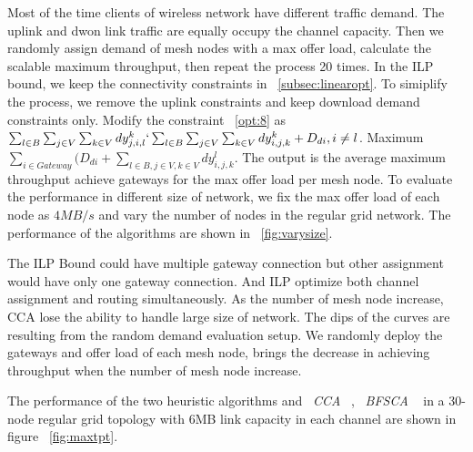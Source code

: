 
Most of the time clients of wireless network have different traffic demand. The uplink and dwon link traffic are equally occupy the channel capacity.
   Then we randomly assign demand of mesh nodes with a max offer load,
   calculate the scalable maximum throughput, then repeat the process 20 times.
   In the ILP bound, we keep the connectivity constraints in ~\ref{subsec:linearopt}. To simiplify the process, we remove the uplink constraints and keep download demand constraints only. 
   Modify the constraint ~\ref{opt:8} as 
   $\sum_{l \in B} \sum_{j \in V} \sum_{k \in V} dy^k_{j,i,l} \lq \sum_{l \in B} \sum_{j \in V} \sum_{k \in V} dy^k_{i,j,k}+D_{di}, i \neq l$. 
   Maximum $\sum_{i\in Gateway} (D_{di}+\sum_{l\in B,j\in V, k \in V}dy^l_{i,j,k}$.
The output is the average maximum throughput achieve gateways for the max offer load per mesh node.
To evaluate the performance in different size of network, we fix the max offer load of each node as $4MB/s$ and vary the number of nodes in the regular grid network. The performance of the algorithms are shown in ~\ref{fig:varysize}. 

The ILP Bound could have multiple gateway connection but other assignment would have only one gateway connection. And ILP optimize both channel assignment and routing simultaneously.  
As the number of mesh node increase, CCA lose the ability to handle large size of network. 
The dips of the curves are resulting from the random demand evaluation setup.
We randomly deploy the gateways and offer load of each mesh node, brings the decrease in achieving throughput when the number of mesh node increase. 


   The performance of the two heuristic algorithms and ~\emph{CCA} ~\cite{draves2004routing}, ~\emph{BFSCA}  ~\cite{ramachandran2006interference} in a 30-node regular grid topology with 6MB link capacity in each channel are shown in figure ~\ref{fig:maxtpt}.

 
